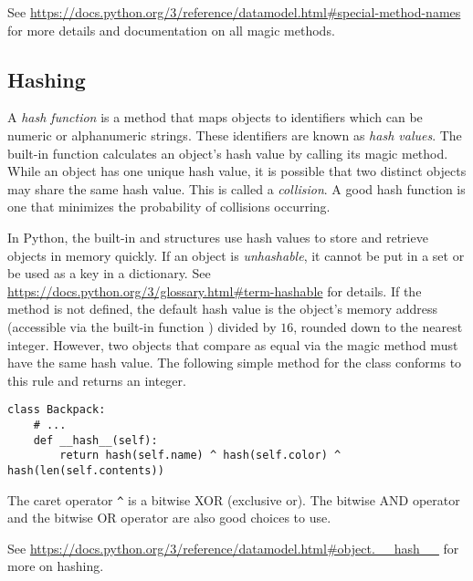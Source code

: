 See \url{https://docs.python.org/3/reference/datamodel.html\#special-method-names} for more details and documentation on all magic methods.

\subsection*{Hashing} %

A \emph{hash function} is a method that maps objects to identifiers which can be numeric or alphanumeric strings.
These identifiers are known as \emph{hash values}.
The built-in  function calculates an object's hash value by calling its  magic method.
While an object has one unique hash value, it is possible that two distinct objects may share the same hash value. 
This is called a \emph{collision}.
A good hash function is one that minimizes the probability of collisions occurring.

%

In Python, the built-in  and  structures use hash values to store and retrieve objects in memory quickly.
If an object is \emph{unhashable}, it cannot be put in a set or be used as a key in a dictionary.
See \url{https://docs.python.org/3/glossary.html\#term-hashable} for details.
If the  method is not defined, the default hash value is the object's memory address (accessible via the built-in function ) divided by $16$, rounded down to the nearest integer.
However, two objects that compare as equal via the  magic method must have the same hash value.
The following simple  method for the  class conforms to this rule and returns an integer.

\begin{lstlisting}
class Backpack:
    # ...
    def __hash__(self):
        return hash(self.name) ^ hash(self.color) ^ hash(len(self.contents))
\end{lstlisting}

The caret operator \texttt{\^} is a bitwise XOR (exclusive or).
The bitwise AND operator \li{&} and the bitwise OR operator \li{|} are also good choices to use.

See \url{https://docs.python.org/3/reference/datamodel.html\#object.__hash__} for more on hashing.

